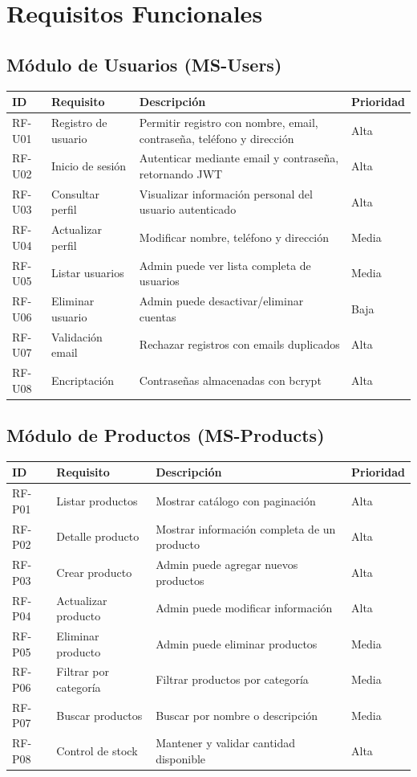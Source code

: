 \documentclass[12pt,a4paper]{article}
\begin{document}
\newpage
\section{Requisitos Funcionales}

\subsection{M\'odulo de Usuarios (MS-Users)}
\begin{longtable}{llp{7cm}l}
\toprule
\textbf{ID} & \textbf{Requisito} & \textbf{Descripci\'on} & \textbf{Prioridad} \\
\midrule
\endhead
RF-U01 & Registro de usuario & Permitir registro con nombre, email, contrase\~na, tel\'efono y direcci\'on & Alta \\
RF-U02 & Inicio de sesi\'on & Autenticar mediante email y contrase\~na, retornando JWT & Alta \\
RF-U03 & Consultar perfil & Visualizar informaci\'on personal del usuario autenticado & Alta \\
RF-U04 & Actualizar perfil & Modificar nombre, tel\'efono y direcci\'on & Media \\
RF-U05 & Listar usuarios & Admin puede ver lista completa de usuarios & Media \\
RF-U06 & Eliminar usuario & Admin puede desactivar/eliminar cuentas & Baja \\
RF-U07 & Validaci\'on email & Rechazar registros con emails duplicados & Alta \\
RF-U08 & Encriptaci\'on & Contrase\~nas almacenadas con bcrypt & Alta \\
\bottomrule
\end{longtable}

\subsection{M\'odulo de Productos (MS-Products)}
\begin{longtable}{llp{7cm}l}
\toprule
\textbf{ID} & \textbf{Requisito} & \textbf{Descripci\'on} & \textbf{Prioridad} \\
\midrule
\endhead
RF-P01 & Listar productos & Mostrar cat\'alogo con paginaci\'on & Alta \\
RF-P02 & Detalle producto & Mostrar informaci\'on completa de un producto & Alta \\
RF-P03 & Crear producto & Admin puede agregar nuevos productos & Alta \\
RF-P04 & Actualizar producto & Admin puede modificar informaci\'on & Alta \\
RF-P05 & Eliminar producto & Admin puede eliminar productos & Media \\
RF-P06 & Filtrar por categor\'ia & Filtrar productos por categor\'ia & Media \\
RF-P07 & Buscar productos & Buscar por nombre o descripci\'on & Media \\
RF-P08 & Control de stock & Mantener y validar cantidad disponible & Alta \\
\bottomrule
\end{longtable}
\end{document}

